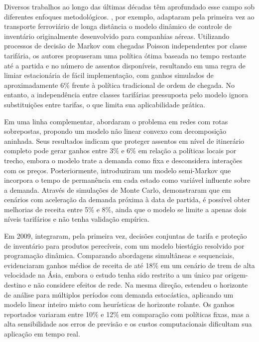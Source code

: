 Diversos trabalhos ao longo das últimas décadas têm aprofundado esse campo sob diferentes enfoques metodológicos. \citep{Feng2001}, por exemplo, adaptaram pela primeira vez ao transporte ferroviário de longa distância o modelo dinâmico de controle de inventário originalmente desenvolvido para companhias aéreas. Utilizando processos de decisão de Markov com chegadas Poisson independentes por classe tarifária, os autores propuseram uma política ótima baseada no tempo restante até a partida e no número de assentos disponíveis, resultando em uma regra de limiar estacionária de fácil implementação, com ganhos simulados de aproximadamente 6\% frente à política tradicional de ordem de chegada. No entanto, a independência entre classes tarifárias pressuposta pelo modelo ignora substituições entre tarifas, o que limita sua aplicabilidade prática.

Em uma linha complementar, \citep{bertsimas2002} abordaram o problema em redes com rotas sobrepostas, propondo um modelo não linear convexo com decomposição aninhada. Seus resultados indicam que proteger assentos em nível de itinerário completo pode gerar ganhos entre 3\% e 6\% em relação a políticas locais por trecho, embora o modelo trate a demanda como fixa e desconsidera interações com os preços. Posteriormente, \citep{Walczak2007} introduziram um modelo semi-Markov que incorpora o tempo de permanência em cada estado como variável influente sobre a demanda. Através de simulações de Monte Carlo, demonstraram que em cenários com aceleração da demanda próxima à data de partida, é possível obter melhorias de receita entre 5\% e 8\%, ainda que o modelo se limite a apenas dois níveis tarifários e não tenha validação empírica.

Em 2009, \citep{CHEW2009} integraram, pela primeira vez, decisões conjuntas de tarifa e proteção de inventário para produtos perecíveis, com um modelo biestágio resolvido por programação dinâmica. Comparando abordagens simultâneas e sequenciais, evidenciaram ganhos médios de receita de até 18\% em um cenário de trem de alta velocidade na Ásia, embora o estudo tenha sido restrito a um único par origem-destino e não considere efeitos de rede. Na mesma direção, \citep{Cizaire2011} estendeu o horizonte de análise para múltiplos períodos com demanda estocástica, aplicando um modelo linear inteiro misto com heurísticas de horizonte rolante. Os ganhos reportados variaram entre 10\% e 12\% em comparação com políticas fixas, mas a alta sensibilidade aos erros de previsão e os custos computacionais dificultam sua aplicação em tempo real.

